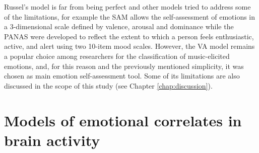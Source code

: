 Russel’s model is far from being perfect and other models tried to address some of the limitations, for example the \ac{SAM} \cite{bradley_measuring_1994} allows the self-assessment of emotions in a 3-dimensional scale defined by valence, arousal and dominance while the \ac{PANAS} \cite{watson_development_nodate} were developed to reflect the extent to which a person feels enthusiastic, active, and alert using two 10-item mood scales. However, the VA model remains a popular choice among researchers for the classification of music-elicited emotions, and, for this reason and the previously mentioned simplicity, it was chosen as main emotion self-assessment tool. Some of its limitations are also discussed in the scope of this study (see Chapter \ref{chap:discussion}).

\section{Models of emotional correlates in brain activity}
\label{sec:emotional_correlates}
